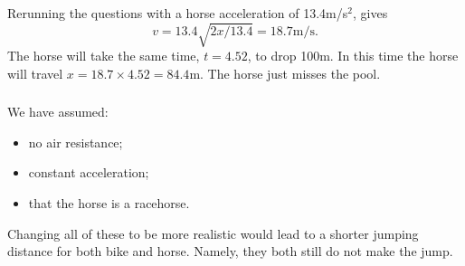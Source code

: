 \documentclass[10pt]{article}
\newcommand{\bb}{\begin{equation}}
\newcommand{\ee}{\end{equation}}
\begin{document}
\begin{Answ}
\subsubsection{}
Rerunning the questions with a horse acceleration of 13.4m/s$^2$, gives
\bb
v=13.4\sqrt{2x/13.4}=18.7\textrm{m/s}.
\ee
The horse will take the same time, $t=4.52$, to drop 100m. In this time the horse will travel $x=18.7\times 4.52=84.4$m. The horse just misses the pool.
\subsubsection{}
We have assumed:
\begin{itemize}
\item no air resistance;
\item constant acceleration;
\item that the horse is a racehorse.
\end{itemize}
Changing all of these to be more realistic would lead to a shorter jumping distance for both bike and horse. Namely, they both still do not make the jump. 
%
\end{Answ}
\end{document}
